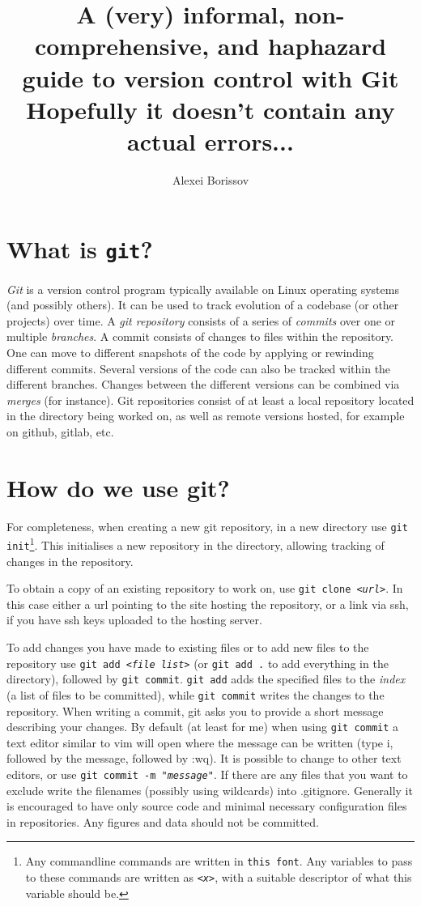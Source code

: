 \documentclass{article}
\title{A (very) informal, non-comprehensive, and haphazard guide to version control with Git \\ \tiny{Hopefully it doesn't contain any actual errors...}}
\author{Alexei Borissov}
\newcommand{\code}[1]{\texttt{#1}}
\newcommand{\ital}[1]{\textit{#1}}
\begin{document}
\maketitle

\section{What is \code{git}?}
\ital{Git} is a version control program typically available on Linux operating systems (and possibly others). It can be used to track evolution of a codebase (or other projects) over time. A \ital{git repository} consists of a series of \ital{commits} over one or multiple \ital{branches}. A commit consists of changes to files within the repository. One can move to different snapshots of the code by applying or rewinding different commits. Several versions of the code can also be tracked within the different branches. Changes between the different versions can be combined via \ital{merges} (for instance). Git repositories consist of at least a local repository located in the directory being worked on, as well as remote versions hosted, for example on github, gitlab, etc. 

\section{How do we use git?}
For completeness, when creating a new git repository, in a new directory use \code{git init}\footnote{Any commandline commands are written in \code{this font}. Any variables to pass to these commands are written as \code{<\ital{x}>}, with a suitable descriptor of what this variable should be.}. This initialises a new repository in the directory, allowing tracking of changes in the repository. 

To obtain a copy of an existing repository to work on, use \code{git clone <\ital{url}>}. In this case either a url pointing to the site hosting the repository, or a link via ssh, if you have ssh keys uploaded to the hosting server. 

To add changes you have made to existing files or to add new files to the repository use \code{git add <\ital{file list}>} (or \code{git add .} to add everything in the directory), followed by \code{git commit}. \code{git add} adds the specified files to the \ital{index} (a list of files to be committed), while \code{git commit} writes the changes to the repository. When writing a commit, git asks you to provide a short message describing your changes. By default (at least for me) when using \code{git commit} a text editor similar to vim will open where the message can be written (type i, followed by the message, followed by :wq). It is possible to change to other text editors, or use \code{git commit -m "\ital{message}"}. If there are any files that you want to exclude write the filenames (possibly using wildcards) into .gitignore. Generally it is encouraged to have only source code and minimal necessary configuration files in repositories. Any figures and data should not be committed.
\end{document}
